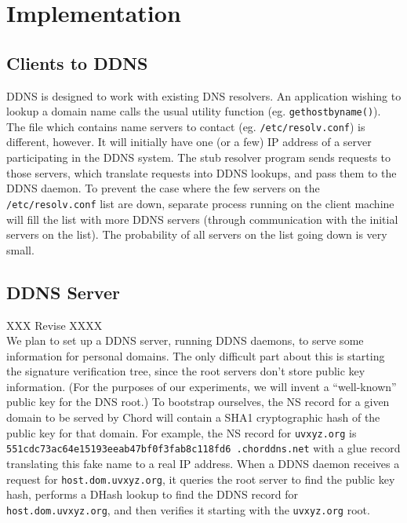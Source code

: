 \section{Implementation}

\subsection{Clients to DDNS}

DDNS is designed to work with existing DNS resolvers. 
An application wishing to lookup a domain name calls
the usual utility function (eg. {\tt gethostbyname()}). 
The file which contains name servers to contact 
(eg. {\tt /etc/resolv.conf}) is different, however.
It will initially have one (or a few) IP address of
a server participating in the DDNS system. The stub 
resolver program sends requests to those servers,
which translate requests into DDNS lookups,
and pass them to the DDNS daemon.
To prevent the case where the few servers on the 
{\tt /etc/resolv.conf} list are down, separate process 
running on the client machine will fill the list with
more DDNS servers (through communication with the initial
servers on the list). The probability of all servers
on the list going down is very small.

\subsection{DDNS Server}

XXX Revise XXXX\\
We plan to set up a DDNS server, running DDNS daemons,
to serve some information for personal domains.
The only difficult part about this is starting the signature
verification tree, since the root servers don't store public
key information. (For the purposes of our experiments,
we will invent a ``well-known'' public key for the DNS root.)
To bootstrap ourselves,
the NS record for a given domain to be served
by Chord will contain a SHA1 cryptographic hash of the
public key for that domain.
For example, the NS record for {\tt uvxyz.org}
is {\tt 551cdc73ac64e15193eeab47bf0f3fab8c118fd6
.chorddns.net}
with a glue record translating this fake name to a real IP address.
When a DDNS daemon receives a request for {\tt host.dom.uvxyz.org},
it queries the root server to find the public key hash,
performs a DHash lookup to find the DDNS record for 
{\tt host.dom.uvxyz.org},
and then verifies it starting with the {\tt uvxyz.org} root.

